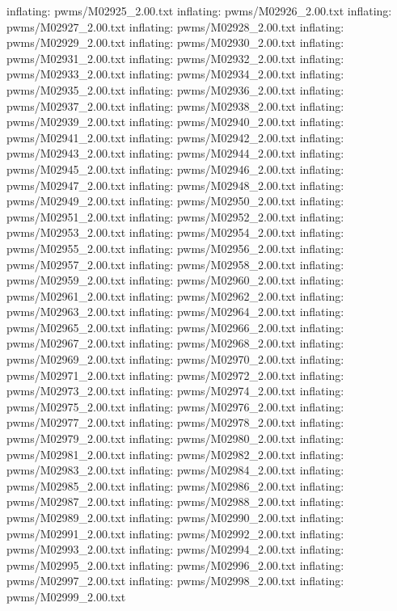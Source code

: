 \documentclass[letterpaper,10pt,english]{sphinxmanual}
\begin{document}
{\begin{sphinxVerbatim}[commandchars=\\\{\}]
  inflating: pwms/M02925\_2.00.txt
  inflating: pwms/M02926\_2.00.txt
  inflating: pwms/M02927\_2.00.txt
  inflating: pwms/M02928\_2.00.txt
  inflating: pwms/M02929\_2.00.txt
  inflating: pwms/M02930\_2.00.txt
  inflating: pwms/M02931\_2.00.txt
  inflating: pwms/M02932\_2.00.txt
  inflating: pwms/M02933\_2.00.txt
  inflating: pwms/M02934\_2.00.txt
  inflating: pwms/M02935\_2.00.txt
  inflating: pwms/M02936\_2.00.txt
  inflating: pwms/M02937\_2.00.txt
  inflating: pwms/M02938\_2.00.txt
  inflating: pwms/M02939\_2.00.txt
  inflating: pwms/M02940\_2.00.txt
  inflating: pwms/M02941\_2.00.txt
  inflating: pwms/M02942\_2.00.txt
  inflating: pwms/M02943\_2.00.txt
  inflating: pwms/M02944\_2.00.txt
  inflating: pwms/M02945\_2.00.txt
  inflating: pwms/M02946\_2.00.txt
  inflating: pwms/M02947\_2.00.txt
  inflating: pwms/M02948\_2.00.txt
  inflating: pwms/M02949\_2.00.txt
  inflating: pwms/M02950\_2.00.txt
  inflating: pwms/M02951\_2.00.txt
  inflating: pwms/M02952\_2.00.txt
  inflating: pwms/M02953\_2.00.txt
  inflating: pwms/M02954\_2.00.txt
  inflating: pwms/M02955\_2.00.txt
  inflating: pwms/M02956\_2.00.txt
  inflating: pwms/M02957\_2.00.txt
  inflating: pwms/M02958\_2.00.txt
  inflating: pwms/M02959\_2.00.txt
  inflating: pwms/M02960\_2.00.txt
  inflating: pwms/M02961\_2.00.txt
  inflating: pwms/M02962\_2.00.txt
  inflating: pwms/M02963\_2.00.txt
  inflating: pwms/M02964\_2.00.txt
  inflating: pwms/M02965\_2.00.txt
  inflating: pwms/M02966\_2.00.txt
  inflating: pwms/M02967\_2.00.txt
  inflating: pwms/M02968\_2.00.txt
  inflating: pwms/M02969\_2.00.txt
  inflating: pwms/M02970\_2.00.txt
  inflating: pwms/M02971\_2.00.txt
  inflating: pwms/M02972\_2.00.txt
  inflating: pwms/M02973\_2.00.txt
  inflating: pwms/M02974\_2.00.txt
  inflating: pwms/M02975\_2.00.txt
  inflating: pwms/M02976\_2.00.txt
  inflating: pwms/M02977\_2.00.txt
  inflating: pwms/M02978\_2.00.txt
  inflating: pwms/M02979\_2.00.txt
  inflating: pwms/M02980\_2.00.txt
  inflating: pwms/M02981\_2.00.txt
  inflating: pwms/M02982\_2.00.txt
  inflating: pwms/M02983\_2.00.txt
  inflating: pwms/M02984\_2.00.txt
  inflating: pwms/M02985\_2.00.txt
  inflating: pwms/M02986\_2.00.txt
  inflating: pwms/M02987\_2.00.txt
  inflating: pwms/M02988\_2.00.txt
  inflating: pwms/M02989\_2.00.txt
  inflating: pwms/M02990\_2.00.txt
  inflating: pwms/M02991\_2.00.txt
  inflating: pwms/M02992\_2.00.txt
  inflating: pwms/M02993\_2.00.txt
  inflating: pwms/M02994\_2.00.txt
  inflating: pwms/M02995\_2.00.txt
  inflating: pwms/M02996\_2.00.txt
  inflating: pwms/M02997\_2.00.txt
  inflating: pwms/M02998\_2.00.txt
  inflating: pwms/M02999\_2.00.txt

\end{sphinxVerbatim}}
\end{document}
